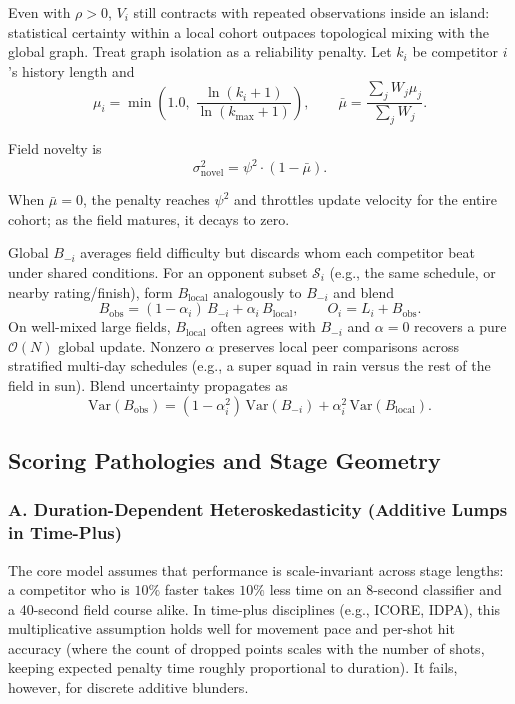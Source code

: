 \documentclass[12pt]{article}
\newcommand{\psii}{\psi^2}
\newcommand{\alphad}{\alpha}    %
\newcommand{\rhoc}{\rho}        %
\newcommand{\kmax}{k_{\mathrm{max}}}
\newcommand{\bobs}{B_{\mathrm{obs}}}
\newcommand{\blocal}{B_{\mathrm{local}}}
\begin{document}
	Even with $\rhoc > 0$, $V_i$ still contracts with repeated observations inside an island: statistical certainty within a local cohort outpaces topological mixing with the global graph. Treat graph isolation as a reliability penalty. Let $k_i$ be competitor $i$'s history length and
	\begin{equation}
		\mu_i = \min\!\left(1.0,\; \frac{\ln(k_i + 1)}{\ln(\kmax + 1)}\right), \qquad
		\bar{\mu} = \frac{\sum_j W_j \mu_j}{\sum_j W_j}.
	\end{equation}
	
	Field novelty is
	\begin{equation}
		\sigma_{\mathrm{novel}}^2 = \psii \cdot (1 - \bar{\mu}).
	\end{equation}
	
	When $\bar{\mu} = 0$, the penalty reaches $\psii$ and throttles update velocity for the entire cohort; as the field matures, it decays to zero.
	
	Global $B_{-i}$ averages field difficulty but discards whom each competitor beat under shared conditions. For an opponent subset $\mathcal{S}_i$ (e.g., the same schedule, or nearby rating/finish), form $B_{\mathrm{local}}$ analogously to $B_{-i}$ and blend
	\begin{equation}
		\bobs = (1 - \alpha_i)\, B_{-i} + \alpha_i\, \blocal, \qquad
		O_i = L_i + \bobs.
	\end{equation}
	On well-mixed large fields, $\blocal$ often agrees with $B_{-i}$ and $\alphad = 0$ recovers a pure $\mathcal{O}(N)$ global update. Nonzero $\alphad$ preserves local peer comparisons across stratified multi-day schedules (e.g., a super squad in rain versus the rest of the field in sun). Blend uncertainty propagates as
	\begin{equation}
		\mathrm{Var}(\bobs) = (1 - \alpha_i^2)\, \mathrm{Var}(B_{-i}) + \alpha_i^2\, \mathrm{Var}(\blocal).
	\end{equation}
	
	\subsection{Scoring Pathologies and Stage Geometry}
	\label{sec:pathologies}
	\subsubsection*{A. Duration-Dependent Heteroskedasticity (Additive Lumps in Time-Plus)}
	\label{sec:lumps}
	The core model assumes that performance is scale-invariant across stage lengths: a competitor who is $10\%$ faster takes $10\%$ less time on an 8-second classifier and a 40-second field course alike. In time-plus disciplines (e.g., ICORE, IDPA), this multiplicative assumption holds well for movement pace and per-shot hit accuracy (where the count of dropped points scales with the number of shots, keeping expected penalty time roughly proportional to duration). It fails, however, for discrete additive blunders.
	
\end{document}
